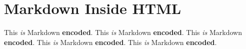 
\def\mytitle{Markdown in HTML Test}
\def\latexmode{memoir}


\chapter{Markdown Inside HTML}
\label{markdowninsidehtml}
This \emph{is} Markdown \textbf{encoded}.
This \emph{is} Markdown \textbf{encoded}.
This \emph{is} Markdown \textbf{encoded}.
This \emph{is} Markdown \textbf{encoded}.
This \emph{is} Markdown \textbf{encoded}.




